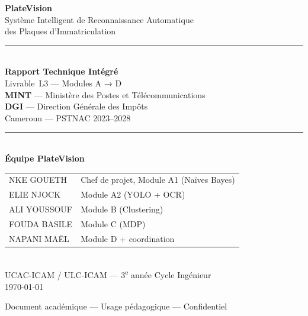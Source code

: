 \documentclass[12pt, a4paper]{report}
\begin{document}
\begin{titlepage}
  \centering
  \vspace*{1.5cm}

  {\Huge \textbf{PlateVision}}\\[0.6em]
  {\Large Système Intelligent de Reconnaissance Automatique\\[0.2em]
   des Plaques d'Immatriculation}\\[2em]

  \rule{0.75\textwidth}{0.5pt}\\[1.5em]

  {\large \textbf{Rapport Technique Intégré}}\\[0.4em]
  {\large Livrable~L3 — Modules A → D}\\[2em]

  {\large \textbf{MINT} — Ministère des Postes et Télécommunications}\\[0.3em]
  {\large \textbf{DGI} — Direction Générale des Impôts}\\[0.3em]
  {\normalsize Cameroun — PSTNAC 2023–2028}\\[2.5em]

  \rule{0.75\textwidth}{0.5pt}\\[1.5em]

  {\large \textbf{Équipe PlateVision}}\\[0.5em]
  \begin{tabular}{ll}
    NKE GOUETH  & Chef de projet, Module A1 (Naïves Bayes) \\
    ELIE NJOCK  & Module A2 (YOLO + OCR) \\
    ALI YOUSSOUF & Module B (Clustering) \\
    FOUDA BASILE & Module C (MDP) \\
    NAPANI MAËL & Module D + coordination \\
  \end{tabular}\\[2em]

  {\normalsize UCAC-ICAM / ULC-ICAM — 3\textsuperscript{e} année Cycle Ingénieur}\\[0.8em]
  {\normalsize \today}

  \vfill
  {\small Document académique — Usage pédagogique — Confidentiel}
\end{titlepage}

\tableofcontents
\newpage
\listoffigures
\listoftables
\newpage
\end{document}
